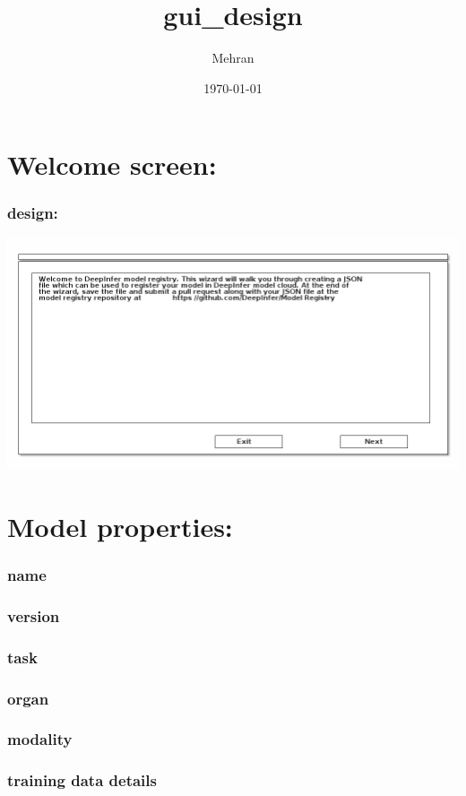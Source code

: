 \documentclass[11pt]{article}
\author{Mehran}
\date{\today}
\title{gui\_design}
\begin{document}
\maketitle
\tableofcontents

\section{Welcome screen:}
\label{sec-1}
\subsubsection{design:}
\label{sec-1-0-1}
\includegraphics[width=.9\linewidth]{welcome.png}

\section{Model properties:}
\label{sec-2}
\subsubsection{name}
\label{sec-2-0-1}
\subsubsection{version}
\label{sec-2-0-2}
\subsubsection{task}
\label{sec-2-0-3}
\subsubsection{organ}
\label{sec-2-0-4}
\subsubsection{modality}
\label{sec-2-0-5}
\subsubsection{training data details}
\label{sec-2-0-6}
\end{document}
